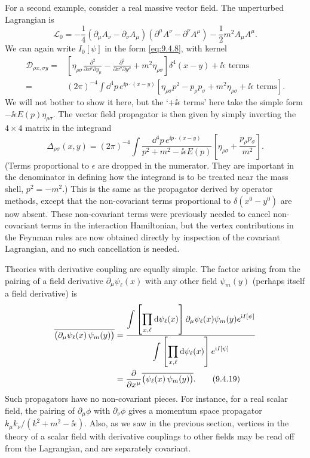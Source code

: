 For a second example, consider a real massive vector field. The unperturbed
Lagrangian is
\[
\mathcal L_0=-\frac14(\partial_\mu A_\nu-\partial_\nu A_\mu)
 (\partial^\mu A^\nu-\partial^\nu A^\mu)-\frac12m^2A_\mu A^\mu.
\]
We can again write $I_0[\psi]$ in the form \eqref{eq:9.4.8}, with kernel
\begin{align*}
\mathcal D_{\rho x,\sigma y}
={}&\left[\eta_{\rho\sigma}
 \frac{\partial^2}{\partial x^\mu\partial y_\mu}
 -\frac{\partial^2}{\partial x^\sigma\partial y^\rho}
 +m^2\eta_{\rho\sigma}\right]\delta^4(x-y)+\ii\epsilon\text{ terms}
\\
={}&(2\pi)^{-4}\int \dd^4p\,e^{\ii p\cdot(x-y)}
 \left[\eta_{\rho\sigma}p^2-p_\rho p_\sigma
 +m^2\eta_{\rho\sigma}+\ii\epsilon\text{ terms}\right].
\end{align*}
We will not bother to show it here, but the `$+\ii\epsilon$ terms' here take the
simple form $-\ii\epsilon E(p)\eta_{\rho\sigma}$. The vector field propagator is
then given by simply inverting the $4\times4$ matrix in the integrand
\[
\Delta_{\rho\sigma}(x,y)=(2\pi)^{-4}\int
 \frac{\dd^4p\,e^{\ii p\cdot(x-y)}}{p^2+m^2-\ii\epsilon E(p)}
 \left[\eta_{\rho\sigma}+\frac{p_\rho p_\sigma}{m^2}\right].
\]
(Terms proportional to $\epsilon$ are dropped in the numerator. They are
important in the denominator in defining how the integrand is to be treated
near the mass shell, $p^2=-m^2$.) This is the same as the propagator derived by
operator methods, except that the non-covariant terms proportional to
$\delta(x^0-y^0)$ are now absent. These non-covariant terms were previously
needed to cancel non-covariant terms in the interaction Hamiltonian, but the
vertex contributions in the Feynman rules are now obtained directly by
inspection of the covariant Lagrangian, and no such cancellation is needed.

Theories with derivative coupling are equally simple. The factor arising from
the pairing of a field derivative $\partial_\mu\psi_\ell(x)$ with any other
field $\psi_m(y)$ (perhaps itself a field derivative) is
\begin{align}
\overline{\bigl(\partial_\mu\psi_\ell(x)\,\psi_m(y)\bigr)}
&=\frac{\displaystyle\int\left[\prod_{x,\ell}\mathop{}\!\mathrm{d}\psi_\ell(x)\right]
 \partial_\mu\psi_\ell(x)\psi_m(y)e^{\mathrm{i} I[\psi]}}
 {\displaystyle\int\left[\prod_{x,\ell}\mathop{}\!\mathrm{d}\psi_\ell(x)\right]e^{\mathrm{i} I[\psi]}}
\notag\\
&=\frac{\partial}{\partial x^\mu}
 \overline{\bigl(\psi_\ell(x)\,\psi_m(y)\bigr)}.
\tag{9.4.19}\label{eq:9.4.19}
\end{align}
Such propagators have no non-covariant pieces. For instance, for a real scalar
field, the pairing of $\partial_\mu\phi$ with $\partial_\nu\phi$ gives a
momentum space propagator $k_\mu k_\nu/(k^2+m^2-\ii\epsilon)$. Also, as we saw in
the previous section, vertices in the theory of a scalar field with derivative
couplings to other fields may be read off from the Lagrangian, and are
separately covariant.
